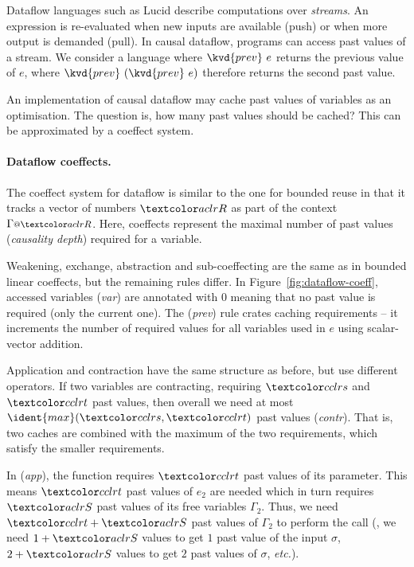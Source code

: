 Dataflow languages such as Lucid \cite{wadge1985lucid} describe computations over \emph{streams}.
An expression is re-evaluated when new inputs are available (push) or when more output
is demanded (pull).  In causal dataflow, programs can access past
values of a stream. We consider a language where $\kvd{prev}~e$
returns the previous value of $e$, where 
$\kvd{prev}~(\kvd{prev}~e)$ therefore returns the second past value.

An implementation of causal dataflow may cache past values of
variables as an optimisation. The question is, how many past values
should be cached?  This can be approximated by a coeffect system.

\paragraph{Dataflow coeffects.} The coeffect system for dataflow is
similar to the one for bounded reuse in that it tracks a vector
of numbers $\aclrd{R}$ as part of the context
$\coctx{\Gamma}{\aclrd{R}}$. Here, coeffects represent the maximal number of
past values (\emph{causality depth}) required for a variable. 

Weakening, exchange, abstraction and sub-coeffecting are the same as in bounded linear
coeffects, but the remaining rules differ. In Figure~\ref{fig:dataflow-coeff},
accessed variables (\emph{var}) are annotated with
$0$ meaning that no past value is required (only the
current one). The (\emph{prev}) rule crates caching requirements --
it increments the number of required values for all variables
used in $e$ using scalar-vector addition.

Application and contraction have the same structure as before, 
but use different operators. If two variables 
are contracting, requiring $\cclrd{s}$ and $\cclrd{t}$ past
values, then overall we need at most
$\ident{max}(\cclrd{s}, \cclrd{t})$ past values (\emph{contr}). That is, 
two caches are combined with the maximum of the two requirements, 
which satisfy the smaller requirements. 

In (\emph{app}), the function requires $\cclrd{t}$ past values of
its parameter.  This means $\cclrd{t}$ past values of
$e_2$ are needed which in turn requires $\aclrd{S}$ past values of its free
variables $\Gamma_2$. Thus, we need $\cclrd{t}+\aclrd{S}$ past values of $\Gamma_2$ to perform the
call (\eg{}, we need $1+\aclrd{S}$ values to
get $1$ past value of the input $\sigma$, $2+\aclrd{S}$
values to get $2$ past values of $\sigma$, \emph{etc.}).


